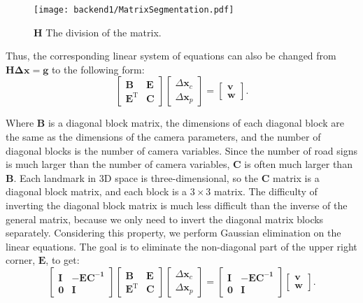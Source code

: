 \begin{figure}[!ht]
\centering
\texttt{[image: backend1/MatrixSegmentation.pdf]}
\caption{$\bm{H}$ The division of the matrix. }
\label{fig:MatrixSegmentation}
\end{figure}

Thus, the corresponding linear system of equations can also be changed from $\bm{H\Delta x} = \bm{g}$ to the following form:
\begin{equation}
\label{eq:linearequations}
 \left[ \begin{matrix}
\bm{B}   &   \bm{E} \\
\bm{E^\mathrm{T}} &   \bm{C}
\end{matrix}\right] 
\left[ \begin{array}{l}
\Delta \bm{x}_c \\
\Delta \bm{x}_p 
\end{array} \right] = 
\left[ \begin{array}{l}
\bm{v} \\
\bm{w} 
\end{array} \right].
\end{equation}

Where $\bm{B}$ is a diagonal block matrix, the dimensions of each diagonal block are the same as the dimensions of the camera parameters, and the number of diagonal blocks is the number of camera variables. Since the number of road signs is much larger than the number of camera variables, $\bm{C}$ is often much larger than $\bm{B}$. Each landmark in 3D space is three-dimensional, so the $\bm{C}$ matrix is ​​a diagonal block matrix, and each block is a $3 \times 3$ matrix. The difficulty of inverting the diagonal block matrix is ​​much less difficult than the inverse of the general matrix, because we only need to invert the diagonal matrix blocks separately. Considering this property, we perform Gaussian elimination on the linear equations. The goal is to eliminate the non-diagonal part of the upper right corner, $\bm{E}$, to get:
\begin{equation}\label{eq:guasselimination}
\left[ \begin{matrix}
\bm{I}   &    -\bm{EC^{-1}} \\
\bm{0}	 &	  \bm{I}
\end{matrix}\right]
\left[ \begin{matrix}
\bm{B}   &   \bm{E} \\
\bm{E^\mathrm{T}} &   \bm{C}
\end{matrix}\right] 
\left[ \begin{array}{l}
\Delta \bm{x}_c \\
\Delta \bm{x}_p 
\end{array} \right] = 
\left[ \begin{matrix}
\bm{I}   &    -\bm{EC^{-1}}  \\
\bm{0}	 &	  \bm{I}
\end{matrix}
\right]
\left[ \begin{array}{l}
\bm{v} \\
\bm{w} 
\end{array} \right]  .
\end{equation}

